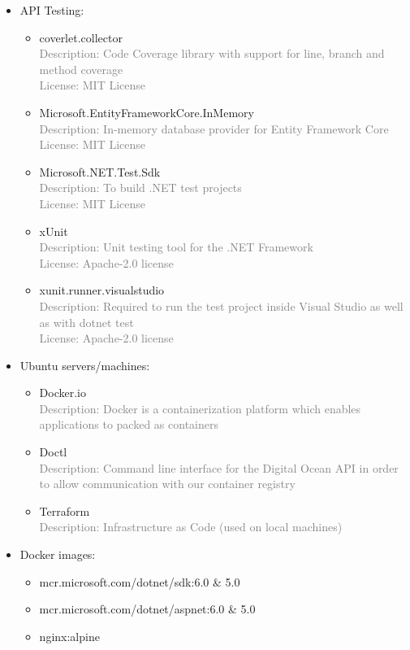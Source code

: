 \documentclass[10pt]{article}
\begin{document}
\begin{itemize}
    \item API Testing:
    \begin{itemize}
        \item coverlet.collector
        \\\textcolor{gray}{Description: Code Coverage library with support for line, branch and method coverage }
        \\\textcolor{gray}{License: MIT License}
        \item Microsoft.EntityFrameworkCore.InMemory
        \\\textcolor{gray}{Description: In-memory database provider for Entity Framework Core}
        \\\textcolor{gray}{License: MIT License}
        \item Microsoft.NET.Test.Sdk
        \\\textcolor{gray}{Description: To build .NET test projects}
        \\\textcolor{gray}{License: MIT License}
        \item xUnit
        \\\textcolor{gray}{Description: Unit testing tool for the .NET Framework}
        \\\textcolor{gray}{License: Apache-2.0 license}
         \item xunit.runner.visualstudio
        \\\textcolor{gray}{Description: Required to run the test project inside Visual Studio as well as with dotnet test}
        \\\textcolor{gray}{License: Apache-2.0 license}
    \end{itemize}

    \item Ubuntu servers/machines:
    \begin{itemize}
        \item Docker.io
        \\\textcolor{gray}{Description: Docker is a containerization platform which enables applications to packed as containers}
        \item Doctl
        \\\textcolor{gray}{Description: Command line interface for the Digital Ocean API in order to allow communication with our container registry}
        \item Terraform
        \\\textcolor{gray}{Description: Infrastructure as Code (used on local machines)}
    \end{itemize}
    
    \item Docker images:
    \begin{itemize}
        \item mcr.microsoft.com/dotnet/sdk:6.0 \& 5.0
        \item mcr.microsoft.com/dotnet/aspnet:6.0 \& 5.0
        \item nginx:alpine
    \end{itemize}

\end{itemize}
\end{document}
